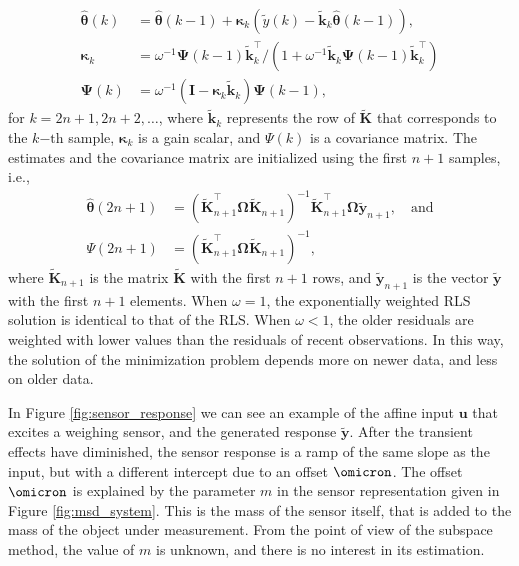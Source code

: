 \begin{equation} \begin{aligned} \widehat{\bm{\theta}}(k) &= \widehat{\bm{\theta}}(k-1) + \bm{\kappa}_{k} \left( \widetilde{y}(k) - \widetilde{\mathbf{k}}_{k} \widehat{\bm{\theta}}(k-1) \right) , \\  \bm{\kappa}_{k} &= \omega^{-1} \bm{\Psi}(k-1) \widetilde{\mathbf{k}}_{k}^\top / \left( 1 + \omega^{-1} \widetilde{\mathbf{k}}_{k} \bm{\Psi}(k-1) \widetilde{\mathbf{k}}_{k}^\top  \right) \\ \bm{\Psi}(k) &= \omega^{-1} \left( \mathbf{I} - \bm{\kappa}_{k} \widetilde{\mathbf{k}}_{k} \right) \bm{\Psi}(k-1), \label{eqn:RLS} \end{aligned} \end{equation}
for $k = 2n+1, 2n+2, \ldots$, where $\widetilde{\mathbf{k}}_{k}$ represents the row of $\widetilde{\mathbf{K}}$ that corresponds to the $k\mathrm{-th}$ sample, $\bm{\kappa}_{k}$ is a gain scalar, and $\Psi(k)$ is a covariance matrix.
The estimates and the covariance matrix are initialized using the first $n+1$ samples, i.e.,  
\begin{equation} \begin{aligned} \widehat{\bm{\theta}} (2n+1) &= \left( \widetilde{\mathbf{K}}_{n+1}^\top  \bm{\Omega} \widetilde{\mathbf{K}}_{n+1} \right)^{-1} \widetilde{\mathbf{K}}_{n+1}^\top \bm{\Omega}  \widetilde{\mathbf{y}}_{n+1}, \quad \mathrm{and} \\ \Psi(2n+1) &= \left( \widetilde{\mathbf{K}}_{n+1}^\top \bm{\Omega} \widetilde{\mathbf{K}}_{n+1} \right)^{-1} , \end{aligned} \end{equation} 
where $\widetilde{\mathbf{K}}_{n+1}$ is the matrix $\widetilde{\mathbf{K}}$ with the first $n+1$ rows, and $\widetilde{\mathbf{y}}_{n+1}$ is the vector $\widetilde{\mathbf{y}}$ with the first $n+1$ elements\color{black}.
When $\omega=1$, the exponentially weighted RLS solution is identical to that of the RLS.
When $\omega<1$, the older residuals are weighted with lower values than the residuals of recent observations.
In this way, the solution of the minimization problem depends more on newer data, and less on older data. 

In Figure \ref{fig:sensor_response} we can see an example of the affine input $\mathbf{u}$ that excites a weighing sensor, and the generated response $\widetilde{\mathbf{y}}$.
After the transient effects have diminished, the sensor response is a ramp of the same slope as the input, but with a different intercept due to an offset $\omicron$.
The offset $\omicron$ is explained by the parameter $m$ in the sensor representation given in Figure \ref{fig:msd_system}.
This is the mass of the sensor itself, that is added to the mass of the object under measurement.	
From the point of view of the subspace method, the value of $m$ is unknown, and there is no interest in its estimation.

